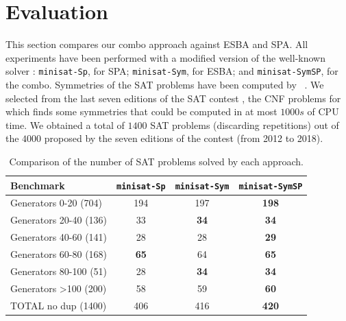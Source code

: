 \section{Evaluation}
This section compares our combo approach against ESBA and SPA. All experiments
have been performed with a modified version of the well-known \minisat{} solver \cite{een2003extensible}: \texttt{minisat-Sp}, for
SPA; \texttt{minisat-Sym}, for ESBA; and \texttt{minisat-SymSP}, for the
combo. Symmetries of the SAT problems have been computed by
\bliss{}~\cite{JunttilaKaski:ALENEX2007}.
We selected from the last seven editions of the SAT contest
\cite{jarvisalo2012international}, the CNF problems for which \bliss{} finds
some symmetries that could be computed in at most $1000s$ of CPU time. We
obtained a total of $1400$ SAT problems (discarding repetitions) out of the
$4000$ proposed by the seven editions of the contest (from 2012 to 2018).
\begin{table}\footnotesize
 \centering
 \begin{tabular}{l|ccc}
  \toprule
  Benchmark  &\texttt{minisat-Sp} & \texttt{minisat-Sym} & \texttt{minisat-SymSP}\\
  \hline 
  Generators 0-20 (704) & 194&197&\cellcolor{gray!30,}\textbf{198}\\
  Generators 20-40 (136) & 33&\cellcolor{gray!30}\textbf{34}&\cellcolor{gray!30}\textbf{34}\\
  Generators 40-60 (141) & 28&28&\cellcolor{gray!30}\textbf{29}\\
  Generators 60-80 (168) & \cellcolor{gray!30}\textbf{65}&64&\cellcolor{gray!30}\textbf{65}\\
  Generators 80-100 (51) & 28&\cellcolor{gray!30}\textbf{34}&\cellcolor{gray!30}\textbf{34}\\
  Generators  \textgreater100 (200) & 58&59&\cellcolor{gray!30}\textbf{60}\\
  \hline 
  TOTAL no dup (1400) & 406 & 416 & \cellcolor{gray!30,}\textbf{420}\\
  \bottomrule
 \end{tabular}
 \caption{Comparison of the number of SAT problems solved by each approach.}
 \label{tab:sat}
\end{table}
